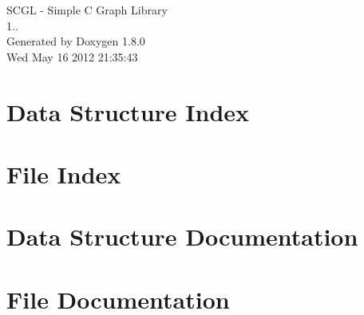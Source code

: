 \documentclass{book}
\begin{document}
\begin{titlepage}
\vspace*{7cm}
\begin{center}
{\Large S\-C\-G\-L -\/ Simple C Graph Library \\[1ex]\large 1.. }\\
\vspace*{1cm}
{\large Generated by Doxygen 1.8.0}\\
\vspace*{0.5cm}
{\small Wed May 16 2012 21:35:43}\\
\end{center}
\end{titlepage}
\clearemptydoublepage
{}
\tableofcontents
\clearemptydoublepage
{}
\chapter{Data Structure Index}

\chapter{File Index}

\chapter{Data Structure Documentation}




\chapter{File Documentation}







\printindex
\end{document}
